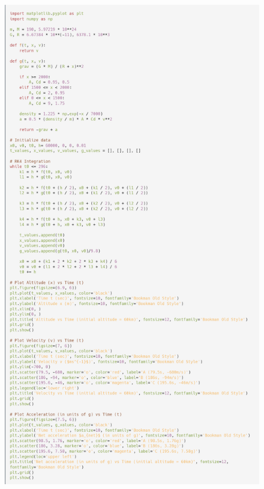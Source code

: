 \documentclass[a4paper, 14pt]{extarticle}
\begin{document}
\begin{figure}[H]
\centering
\includegraphics[width=0.87\linewidth]{3.png}
\caption*{}
\end{figure}
\end{document}
